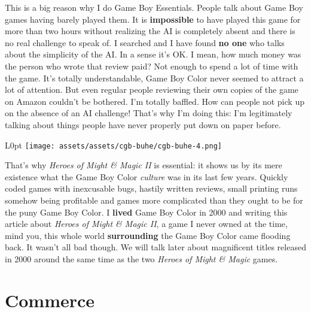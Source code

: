 \documentclass{book}
\begin{document}
This is a big reason why I do Game Boy Essentials. People talk about Game Boy games having barely played them. It is \textbf{impossible} to have played this game for more than two hours without realizing the AI is completely absent and there is no real challenge to speak of. I searched and I have found \textbf{no one} who talks about the simplicity of the AI. In a sense it’s OK. I mean, how much money was the person who wrote that review paid? Not enough to spend a lot of time with the game. It’s totally understandable, Game Boy Color never seemed to attract a lot of attention. But even regular people reviewing their own copies of the game on Amazon couldn’t be bothered. I’m totally baffled. How can people not pick up on the absence of an AI challenge! That’s why I’m doing this: I’m legitimately talking about things people have never properly put down on paper before.

\begin{wrapfigure}{L}{0pt} \texttt{[image: assets/assets/cgb-buhe/cgb-buhe-4.png]}\end{wrapfigure}
That’s why \emph{Heroes of Might \& Magic II} is essential: it shows us by its mere existence what the Game Boy Color \emph{culture} was in its last few years. Quickly coded games with inexcusable bugs, hastily written reviews, small printing runs somehow being profitable and games more complicated than they ought to be for the puny Game Boy Color. I \textbf{lived} Game Boy Color in 2000 and writing this article about \emph{Heroes of Might \& Magic II}, a game I never owned at the time, mind you, this whole world \textbf{surrounding} the Game Boy Color came flooding back. It wasn’t all bad though. We will talk later about magnificent titles released in 2000 around the same time as the two \emph{Heroes of Might \& Magic} games.

\FloatBarrier\needspace{10mm}\section*{Commerce}\nopagebreak[4]
\end{document}
